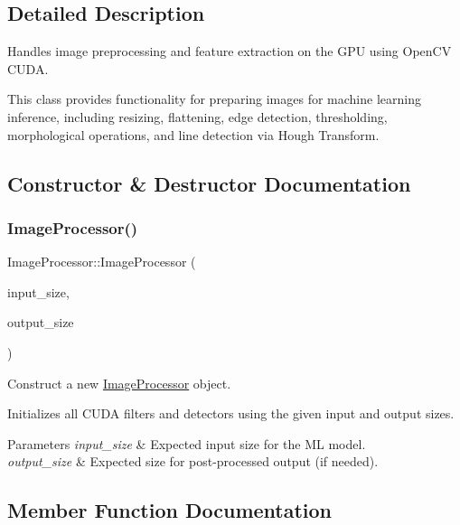 \subsection{Detailed Description}
Handles image preprocessing and feature extraction on the G\+PU using Open\+CV C\+U\+DA. 

This class provides functionality for preparing images for machine learning inference, including resizing, flattening, edge detection, thresholding, morphological operations, and line detection via Hough Transform. 

\subsection{Constructor \& Destructor Documentation}
\mbox{\label{classImageProcessor_af52cf1abf1dacffda01cc55b6f5c8313}} 
\subsubsection{\texorpdfstring{Image\+Processor()}{ImageProcessor()}}
{\footnotesize\ttfamily Image\+Processor\+::\+Image\+Processor (\begin{DoxyParamCaption}\item[{const cv\+::\+Size \&}]{input\+\_\+size,  }\item[{const cv\+::\+Size \&}]{output\+\_\+size }\end{DoxyParamCaption})}



Construct a new \hyperlink{classImageProcessor}{Image\+Processor} object. 

Initializes all C\+U\+DA filters and detectors using the given input and output sizes.


\begin{DoxyParams}{Parameters}
{\em input\+\_\+size} & Expected input size for the ML model. \\
\hline
{\em output\+\_\+size} & Expected size for post-\/processed output (if needed). \\
\hline
\end{DoxyParams}


\subsection{Member Function Documentation}
\mbox{\label{classImageProcessor_a54826c571dfde1f85fec2ad86f21f69a}} 
